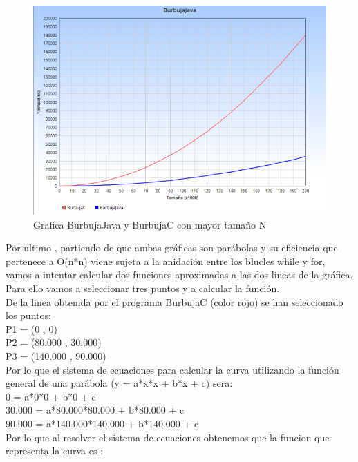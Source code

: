 	\begin{figure}[htb]
		\centering
		\includegraphics[width=1.0\textwidth]{./imagenes/5}
		\caption{Grafica BurbujaJava y BurbujaC con mayor tamaño N} \label{fig:1}
	\end{figure}
	
	Por ultimo , partiendo de que ambas gráficas son parábolas y su eficiencia que pertenece a O(n*n) viene sujeta a la anidación entre los blucles while y for, vamos a intentar calcular dos funciones aproximadas a las dos lineas de la gráfica. Para ello vamos a seleccionar tres puntos y a calcular la función.\\
	
	De la linea obtenida por el programa BurbujaC (color rojo) se han seleccionado los puntos:\\
	
	P1 = (0 , 0)\\
	P2 = (80.000 , 30.000)\\
	P3 = (140.000 , 90.000)\\
	
	Por lo que el sistema de ecuaciones para calcular la curva utilizando la función general de una parábola (y = a*x*x + b*x + c) sera:\\
	
	0 = a*0*0 + b*0 + c\\
	30.000 = a*80.000*80.000 + b*80.000 + c\\
	90.000 = a*140.000*140.000 + b*140.000 + c\\
	
	Por lo que al resolver el sistema de ecuaciones obtenemos que la funcion que representa la curva es :\\
	
